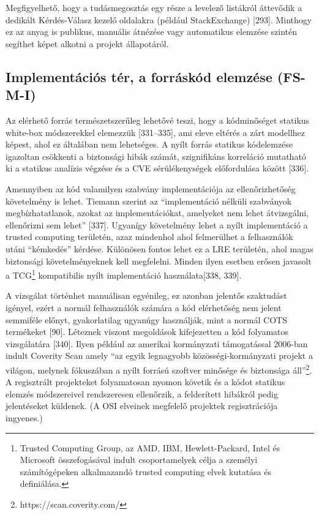 \documentclass[12pt,magyar,a4paper,oneside]{scrreprt}
\begin{document}
Megfigyelhető, hogy a tudásmegosztás egy része a levelező listákról
áttevődik a dedikált Kérdés-Válasz kezelő oldalakra (például
StackExchange) {[}293{]}. Minthogy ez az anyag is publikus, manuális
átnézése vagy automatikus elemzése szintén segíthet képet alkotni a
projekt állapotáról.

\hypertarget{sec:FS-M-I}{%
\subsection{Implementációs tér, a forráskód elemzése
(FS-M-I)}\label{sec:FS-M-I}}

Az elérhető forrás természetszerűleg lehetővé teszi, hogy a kódminőséget
statikus white-box módszerekkel elemezzük {[}331--335{]}, ami eleve
eltérés a zárt modellhez képest, ahol ez általában nem lehetséges. A
nyílt forrás statikus kódelemzése igazoltan csökkenti a biztonsági hibák
számát, szignifikáns korreláció mutatható ki a statikus analízis végzése
és a CVE sérülékenységek előfordulása között {[}336{]}.

Amennyiben az kód valamilyen szabvány implementációja az
ellenőrizhetőség követelmény is lehet. Tiemann szerint az
``implementáció nélküli szabványok megbízhatatlanok, azokat az
implementációkat, amelyeket nem lehet átvizsgálni, ellenőrizni sem
lehet'' {[}337{]}. Ugyanígy követelmény lehet a nyílt implementáció a
trusted computing területén, azaz mindenhol ahol felmerülhet a
felhasználók utáni ``kémkedés'' kérdése. Különösen fontos lehet ez a LRE
területén, ahol magas biztonsági követelményeknek kell megfelelni.
Minden ilyen esetben erősen javasolt a TCG\footnote{Trusted Computing
  Group, az AMD, IBM, Hewlett-Packard, Intel és Microsoft összefogásával
  indult csoportamelyek célja a személyi számítógépeken alkalmazandó
  trusted computing elvek kutatása és definiálása.} kompatibilis nyílt
implementáció használata{[}338, 339{]}.

A vizsgálat történhet manuálisan egyénileg, ez azonban jelentős
szaktudást igényel, ezért a normál felhasználók számára a kód
elérhetőség nem jelent semmiféle előnyt, gyakorlatilag ugyanúgy
használják, mint a normál COTS termékeket {[}90{]}. Léteznek viszont
megoldások kifejezetten a kód folyamatos vizsgálatára {[}340{]}. Ilyen
például az amerikai kormányzati támogatással 2006-ban indult Coverity
Scan amely ``az egyik legnagyobb közösségi-kormányzati projekt a
világon, melynek fókuszában a nyílt forrású szoftver minősége és
biztonsága áll''\footnote{https://scan.coverity.com/}. A regisztrált
projekteket folyamatosan nyomon követik és a kódot statikus elemzés
módszereivel rendszeresen ellenőrzik, a felderített hibákról pedig
jelentéseket küldenek. (A OSI elveinek megfelelő projektek
regisztrációja ingyenes.)
\end{document}
